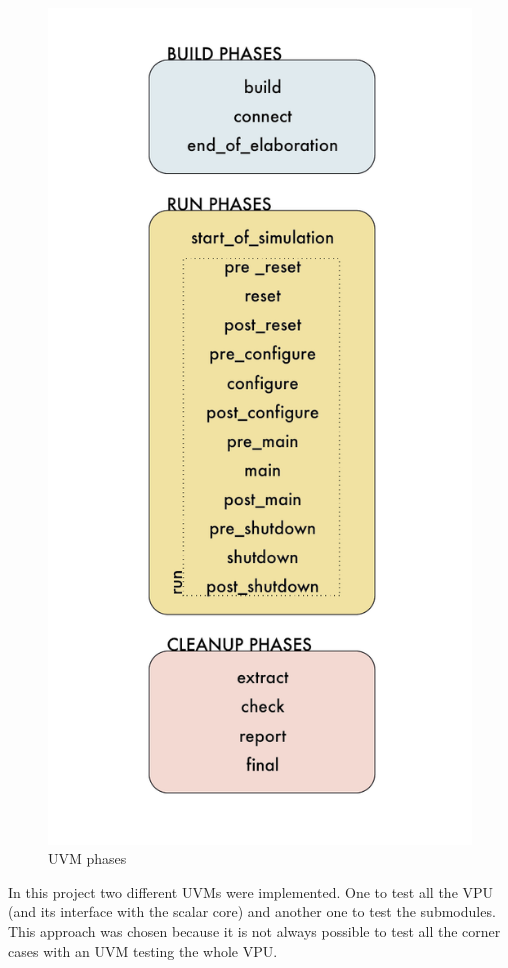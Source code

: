 \begin{figure}[H]
    \centering
    \includegraphics[scale = 0.6]{Chapter_1/img/phases-uvm.png}
    \caption{UVM phases}
    \label{phases-uvm}
\end{figure}


In this project two different UVMs were implemented. One to test all the VPU (and its interface with the scalar core) and another one to test the submodules. This approach was chosen because it is not always possible to test all the corner cases with an UVM testing the whole VPU.

